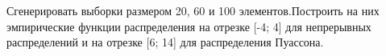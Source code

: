\item Сгенерировать выборки размером 20, 60 и 100 элементов.\newline Построить на них эмпирические функции распределения
    на отрезке [-4; 4] для непрерывных распределений и на отрезке [6; 14] для распределения Пуассона.